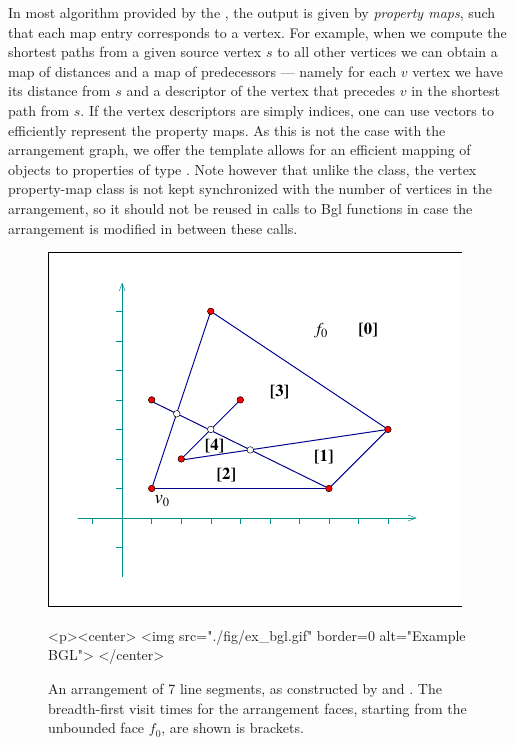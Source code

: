 In most algorithm provided by the \bgl, the output is given by
{\em property maps}, such that each map entry corresponds to a vertex.
For example, when we compute the shortest paths from a given source vertex
$s$ to all other vertices we can obtain a map of distances and a map of
predecessors --- namely for each $v$ vertex we have its distance from $s$
and a descriptor of the vertex that precedes $v$ in the shortest path from $s$.
If the vertex descriptors are simply indices, one can use vectors to
efficiently represent the property maps. As this is not the case with the
arrangement graph, we offer the 
template allows for an efficient mapping of  objects to
properties of type . Note however that unlike the
 class, the vertex property-map class is not
kept synchronized with the number of vertices in the arrangement, so it
should not be reused in calls to {\sc Bgl} functions in case the arrangement
is modified in between these calls.

\begin{figure}[t]
\begin{ccTexOnly}
  \begin{center}
  \includegraphics{BGL/fig/ex_bgl}
  \end{center}
\end{ccTexOnly}
\begin{ccHtmlOnly}
  <p><center>
  <img src="./fig/ex_bgl.gif" border=0 alt="Example BGL">
  </center>
\end{ccHtmlOnly}
\caption{An arrangement of 7 line segments, as constructed by
 and .
The breadth-first visit times for the arrangement faces, starting
from the unbounded face $f_0$, are shown is brackets.}
\label{arr_fig:ex_bgl}
\end{figure}


